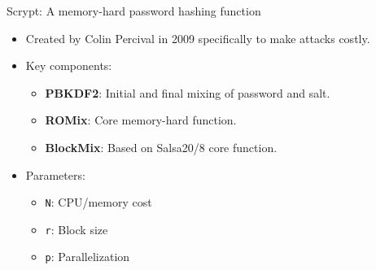\documentclass[aspectratio=169, lualatex, handout]{beamer}
\begin{document}
\begin{frame}{Scrypt: A memory-hard password hashing function}
	\begin{itemize}[<+->]
		\item Created by Colin Percival in 2009 specifically to make attacks costly.
		\item Key components:
		      \begin{itemize}
			      \item \textbf{PBKDF2}: Initial and final mixing of password and salt.
			      \item \textbf{ROMix}: Core memory-hard function.
			      \item \textbf{BlockMix}: Based on Salsa20/8 core function.
		      \end{itemize}
		\item{Parameters:}
		      \begin{itemize}
			      \item \texttt{N}: CPU/memory cost
			      \item \texttt{r}: Block size
			      \item \texttt{p}: Parallelization
		      \end{itemize}
	\end{itemize}
\end{frame}
\end{document}
